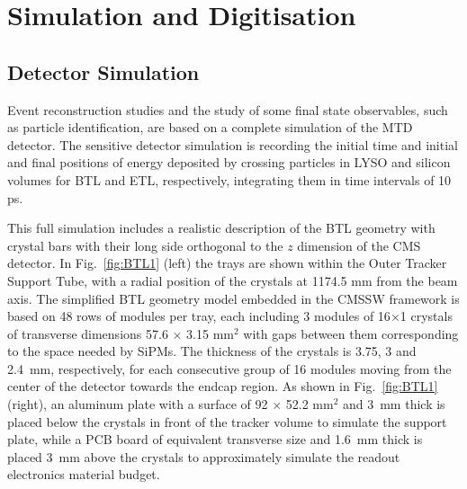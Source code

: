 \section{Simulation and Digitisation}

\subsection{Detector Simulation}

Event reconstruction studies and the study of some final state observables, such as particle identification, are based on a complete \GEANT simulation of the MTD detector. The sensitive detector simulation is recording the initial time and initial and final positions of energy deposited by crossing particles in LYSO and silicon volumes for BTL and ETL, respectively, integrating them in time intervals of 10 ps. 

This full simulation includes a realistic description of the BTL geometry with crystal bars with their long side orthogonal to the $z$ dimension of the CMS detector. In Fig.~\ref{fig:BTL1} (left) the trays are shown within the Outer Tracker Support Tube, with a radial position of the crystals at 1174.5 mm from the beam axis. The simplified BTL geometry model embedded in the CMSSW framework is based on 48 rows of modules per tray, each including 3 modules of 16$\times$1 crystals of transverse dimensions 57.6 $\times$ 3.15 mm$^2$ with gaps between them corresponding to the space needed by SiPMs. The thickness of the crystals is 3.75, 3 and 2.4~mm, respectively, for each consecutive group of 16 modules moving from the center of the detector towards the endcap region. As shown in Fig.~\ref{fig:BTL1} (right), an aluminum plate with a surface of 92 $\times$ 52.2 mm$^2$ and 3~mm thick is placed below the crystals in front of the tracker volume to simulate the support plate, while a PCB board of equivalent transverse size and 1.6~mm thick is placed 3~mm above the crystals to approximately simulate the readout electronics material budget.

